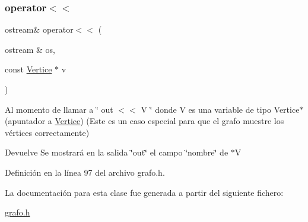 \subsubsection{\texorpdfstring{operator$<$$<$}{operator<<}\hspace{0.1cm}{\footnotesize\ttfamily [2/2]}}
{\footnotesize\ttfamily ostream\& operator$<$$<$ (\begin{DoxyParamCaption}\item[{ostream \&}]{os,  }\item[{const \hyperlink{classVertice}{Vertice} $\ast$}]{v }\end{DoxyParamCaption})\hspace{0.3cm}{\ttfamily [friend]}}



Al momento de llamar a \char`\"{} out $<$$<$ V \char`\"{} donde V es una variable de tipo Vertice$\ast$ (apuntador a \hyperlink{classVertice}{Vertice}) (Este es un caso especial para que el grafo muestre los vértices correctamente) 

\begin{DoxyReturn}{Devuelve}
Se mostrará en la salida \char`\"{}out\char`\"{} el campo \char`\"{}nombre\char`\"{} de $\ast$V 
\end{DoxyReturn}


Definición en la línea 97 del archivo grafo.\+h.



La documentación para esta clase fue generada a partir del siguiente fichero\+:\begin{DoxyCompactItemize}
\item 
\hyperlink{grafo_8h}{grafo.\+h}\end{DoxyCompactItemize}
